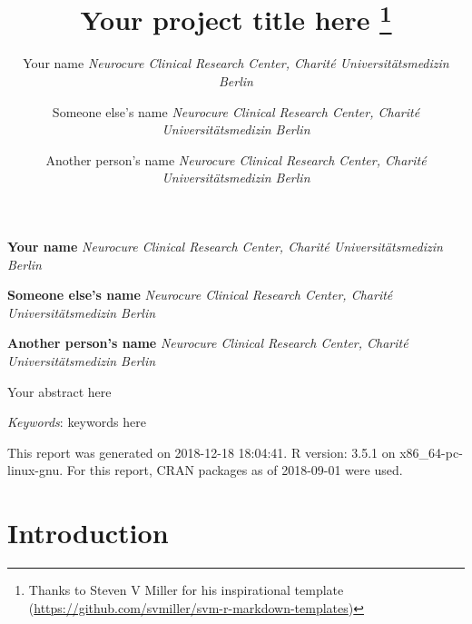 \documentclass[11pt,]{article}
\title{Your project title here \thanks{Thanks to Steven V Miller for his inspirational template
(\url{https://github.com/svmiller/svm-r-markdown-templates})}  }
\author{\Large Your name\vspace{0.05in} \newline\normalsize\emph{Neurocure Clinical Research Center, Charité Universitätsmedizin Berlin}   \and \Large Someone else's name\vspace{0.05in} \newline\normalsize\emph{Neurocure Clinical Research Center, Charité Universitätsmedizin Berlin}   \and \Large Another person's name\vspace{0.05in} \newline\normalsize\emph{Neurocure Clinical Research Center, Charité Universitätsmedizin Berlin}  }
\date{}
\newcommand*{\authorfont}{\fontfamily{phv}\selectfont}
\renewenvironment{abstract}
 {{%
    \setlength{\leftmargin}{0mm}
    \setlength{\rightmargin}{\leftmargin}%
  }%
  \relax}
 {\endlist}
\begin{document}
	
%

{%
\setlength{\parindent}{0pt}
\thispagestyle{plain}
{\fontsize{18}{20}\selectfont\raggedright 
\maketitle  %

}

{
   \vskip 13.5pt\relax \normalsize\fontsize{11}{12} 
\textbf{\authorfont Your name} \hskip 15pt \emph{\small Neurocure Clinical Research Center, Charité Universitätsmedizin Berlin}   \par \textbf{\authorfont Someone else's name} \hskip 15pt \emph{\small Neurocure Clinical Research Center, Charité Universitätsmedizin Berlin}   \par \textbf{\authorfont Another person's name} \hskip 15pt \emph{\small Neurocure Clinical Research Center, Charité Universitätsmedizin Berlin}   

}

}








\begin{abstract}

    \hbox{\vrule height .2pt width 39.14pc}

    \vskip 8.5pt %

\noindent Your abstract here


\vskip 8.5pt \noindent \emph{Keywords}: keywords here \par

    \hbox{\vrule height .2pt width 39.14pc}



\end{abstract}


\vskip 6.5pt


\noindent \doublespacing This report was generated on 2018-12-18 18:04:41. R version: 3.5.1 on
x86\_64-pc-linux-gnu. For this report, CRAN packages as of 2018-09-01
were used.

\section{Introduction}\label{introduction}
\end{document}
